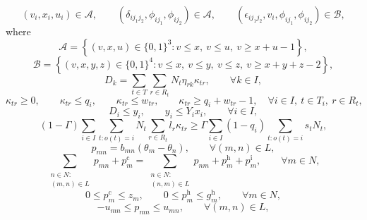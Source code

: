 \documentclass[11pt,a4paper]{article}
\begin{document}
\begin{equation}
(v_i,x_i,u_i) \in \mathcal A,
\qquad
(\delta_{ij_1 j_2},\phi_{ij_1},\phi_{ij_2}) \in \mathcal A,
\qquad
(\epsilon_{ij_1 j_2},v_i,\phi_{ij_1},\phi_{ij_2}) \in \mathcal B,
\tag{M12}
\end{equation}
where
\begin{equation}
\mathcal A =
\left\{
(v,x,u) \in \{0,1\}^3 :
v \le x,\ v \le u,\ v \ge x+u-1
\right\},
\tag{M13}
\end{equation}
\begin{equation}
\mathcal B =
\left\{
(v,x,y,z) \in \{0,1\}^4 :
v \le x,\ v \le y,\ v \le z,\ v \ge x+y+z-2
\right\},
\tag{M14}
\end{equation}
\begin{equation}
D_k = \sum_{t \in T} \sum_{r \in R_t} N_t \eta_{rk} \kappa_{tr},
\qquad \forall k \in I,
\tag{M15}
\end{equation}
\begin{equation}
\kappa_{tr} \ge 0,\qquad
\kappa_{tr} \le q_i,\qquad
\kappa_{tr} \le w_{tr},\qquad
\kappa_{tr} \ge q_i + w_{tr} - 1,
\quad \forall i \in I,\ t \in T_i,\ r \in R_t,
\tag{M16}
\end{equation}
\begin{equation}
D_i \le y_i,
\qquad
y_i \le Y_i x_i,
\qquad \forall i \in I,
\tag{M17}
\end{equation}
\begin{equation}
(1-\Gamma)\sum_{i \in I}\sum_{t:o(t)=i} N_t \sum_{r \in R_t} l_r \kappa_{tr}
\ge
\Gamma \sum_{i \in I} (1-q_i)\sum_{t:o(t)=i} s_t N_t,
\tag{M18}
\end{equation}
\begin{equation}
p_{mn} = b_{mn}(\theta_m - \theta_n),
\qquad \forall (m,n) \in L,
\tag{M19}
\end{equation}
\begin{equation}
\sum_{\substack{n \in N:\\(m,n)\in L}} p_{mn} + p_m^{\mathrm c}
=
\sum_{\substack{n \in N:\\(n,m)\in L}} p_{nm} + p_m^{\mathrm h} + p_m^{\mathrm i},
\qquad \forall m \in N,
\tag{M20}
\end{equation}
\begin{equation}
0 \le p_m^{\mathrm c} \le z_m,
\qquad
0 \le p_m^{\mathrm h} \le g_m^{\mathrm h},
\qquad \forall m \in N,
\tag{M21}
\end{equation}
\begin{equation}
-u_{mn} \le p_{mn} \le u_{mn},
\qquad \forall (m,n) \in L,
\tag{M22}
\end{equation}
\end{document}
